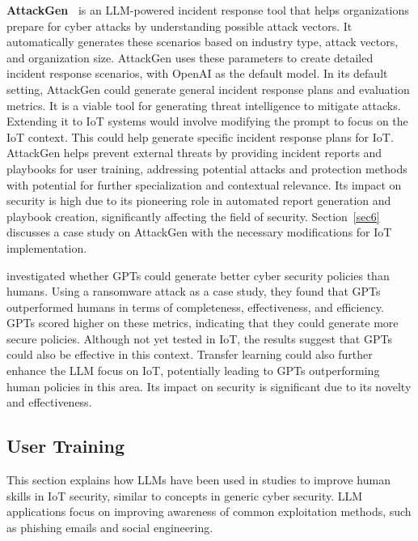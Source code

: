 %
\smallskip
\noindent \textbf{AttackGen~\citet{Adams_2024}} is an LLM-powered incident response tool that helps organizations prepare for cyber attacks by understanding possible attack vectors.
It automatically generates these scenarios based on industry type, attack vectors, and organization size.
AttackGen uses these parameters to create detailed incident response scenarios, with OpenAI as the default model.
In its default setting, AttackGen could generate general incident response plans and evaluation metrics.
It is a viable tool for generating threat intelligence to mitigate attacks.
Extending it to IoT systems would involve modifying the prompt to focus on the IoT context.
This could help generate specific incident response plans for IoT.
AttackGen helps prevent external threats by providing incident reports and playbooks for user training, addressing potential attacks and protection methods with potential for further specialization and contextual relevance. 
Its impact on security is high due to its pioneering role in automated report generation and playbook creation, significantly affecting the field of security.
Section~\ref{sec6} discusses a case study on AttackGen with the necessary modifications for IoT implementation.

\smallskip
\noindent \textbf{\citet{mcintosh2023harnessing}} investigated whether GPTs could generate better cyber security policies than humans.
Using a ransomware attack as a case study, they found that GPTs outperformed humans in terms of completeness, effectiveness, and efficiency.
GPTs scored higher on these metrics, indicating that they could generate more secure policies.
Although not yet tested in IoT, the results suggest that GPTs could also be effective in this context.
Transfer learning could also further enhance the LLM focus on IoT, potentially leading to GPTs outperforming human policies in this area.
Its impact on security is significant due to its novelty and effectiveness.
%
\subsection{User Training}
%
This section explains how LLMs have been used in studies to improve human skills in IoT security, similar to concepts in generic cyber security.
LLM applications focus on improving awareness of common exploitation methods, such as phishing emails and social engineering.

